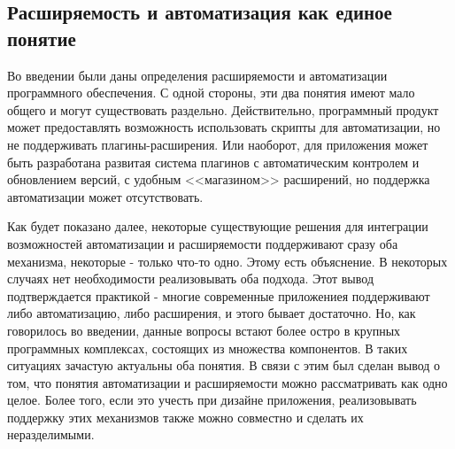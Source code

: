 \subsection{Расширяемость и автоматизация как единое понятие}

Во введении были даны определения расширяемости и автоматизации программного обеспечения. С одной стороны, эти два понятия имеют мало общего и могут существовать раздельно. Действительно, программный продукт может предоставлять возможность использовать скрипты для автоматизации, но не поддерживать плагины-расширения. Или наоборот, для приложения может быть разработана развитая система плагинов с автоматическим контролем и обновлением версий, с удобным <<магазином>> расширений, но поддержка автоматизации может отсутствовать.

Как будет показано далее, некоторые существующие решения для интеграции возможностей автоматизации и расширяемости поддерживают сразу оба механизма, некоторые - только что-то одно. Этому есть объяснение. В некоторых случаях нет необходимости реализовывать оба подхода. Этот вывод подтверждается практикой - многие современные приложениея поддерживают либо автоматизацию, либо расширения, и этого бывает достаточно. Но, как говорилось во введении, данные вопросы встают более остро в крупных программных комплексах, состоящих из множества компонентов. В таких ситуациях зачастую актуальны оба понятия. В связи с этим был сделан вывод о том, что понятия автоматизации и расширяемости можно рассматривать как одно целое. Более того, если это учесть при дизайне приложения, реализовывать поддержку этих механизмов также можно совместно и сделать их неразделимыми.



